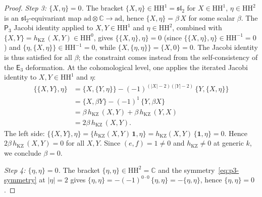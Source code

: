 \documentclass[11pt,reqno]{amsart}
\theoremstyle{definition}
\theoremstyle{remark}
\newcommand{\HH}{\mathrm{HH}}
\newcommand{\Ethree}{\mathsf{E}_{3}}
\newcommand{\Pthree}{\mathsf{P}_{3}}
\newcommand{\CC}{\mathbb{C}}
\numberwithin{equation}{section}
\begin{document}
\begin{proof}
\textit{Step 3: $\{X, \eta\} = 0$.}
The bracket $\{X, \eta\} \in \HH^1 = \mathfrak{sl}_2$
for $X \in \HH^1$, $\eta \in \HH^2$ is an
$\mathfrak{sl}_2$-equivariant map
$\mathrm{ad} \otimes \CC \to \mathrm{ad}$,
hence $\{X, \eta\} = \beta\,X$ for some scalar $\beta$.
The $\Pthree$ Jacobi identity applied to
$X, Y \in \HH^1$ and $\eta \in \HH^2$,
combined with
$\{X, Y\} = h_{\mathrm{KZ}}\,(X, Y) \in \HH^0$, gives
$\{\{X, \eta\}, \eta\} = 0$ (since
$\{\{X, \eta\}, \eta\} \in \HH^{-1} = 0$) and
$\{\eta, \{X, \eta\}\} \in \HH^{-1} = 0$,
while $\{X, \{\eta, \eta\}\} = \{X, 0\} = 0$.
The Jacobi identity is thus satisfied for all $\beta$;
the constraint comes instead from the self-consistency
of the $\Ethree$ deformation.
At the cohomological level, one applies the iterated Jacobi
identity to $X, Y \in \HH^1$ and $\eta$:
\begin{align*}
  \{\{X, Y\}, \eta\}
  &= \{X, \{Y, \eta\}\}
  - (-1)^{(|X|-2)(|Y|-2)}\,\{Y, \{X, \eta\}\} \\
  &= \{X, \beta Y\} - (-1)^1\,\{Y, \beta X\} \\
  &= \beta\,h_{\mathrm{KZ}}\,(X, Y)
  + \beta\,h_{\mathrm{KZ}}\,(Y, X) \\
  &= 2\beta\,h_{\mathrm{KZ}}\,(X, Y).
\end{align*}
The left side:
$\{\{X, Y\}, \eta\}
= \{h_{\mathrm{KZ}}(X, Y)\,\mathbf{1}, \eta\}
= h_{\mathrm{KZ}}(X, Y)\,\{\mathbf{1}, \eta\} = 0$.
Hence $2\beta\,h_{\mathrm{KZ}}\,(X, Y) = 0$ for all
$X, Y$. Since
$(e, f) = 1 \neq 0$ and $h_{\mathrm{KZ}} \neq 0$ at
generic $k$, we conclude $\beta = 0$.

\textit{Step 4: $\{\eta, \eta\} = 0$.}
The bracket $\{\eta, \eta\} \in \HH^2 = \CC$ and
the symmetry~\eqref{eq:p3-symmetry} at
$|\eta| = 2$ gives
$\{\eta, \eta\} = -(-1)^{0 \cdot 0}\,\{\eta, \eta\}
= -\{\eta, \eta\}$, hence $\{\eta, \eta\} = 0$.
\end{proof}
\end{document}
